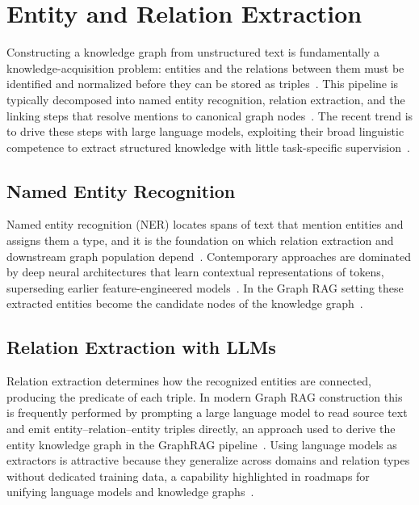 \section{Entity and Relation Extraction}
\label{sec:gr-extraction}

Constructing a knowledge graph from unstructured text is fundamentally a
knowledge-acquisition problem: entities and the relations between them must be
identified and normalized before they can be stored as
triples~\cite{ji2021kgsurvey}. This pipeline is typically decomposed into named
entity recognition, relation extraction, and the linking steps that resolve
mentions to canonical graph nodes~\cite{ji2021kgsurvey}. The recent trend is to
drive these steps with large language models, exploiting their broad linguistic
competence to extract structured knowledge with little task-specific
supervision~\cite{pan2024unifying}.

\subsection{Named Entity Recognition}

Named entity recognition (NER) locates spans of text that mention entities and
assigns them a type, and it is the foundation on which relation extraction and
downstream graph population depend~\cite{li2022ner}. Contemporary approaches are
dominated by deep neural architectures that learn contextual representations of
tokens, superseding earlier feature-engineered models~\cite{li2022ner}. In the
Graph RAG setting these extracted entities become the candidate nodes of the
knowledge graph~\cite{edge2024graphrag}.

\subsection{Relation Extraction with LLMs}

Relation extraction determines how the recognized entities are connected,
producing the predicate of each triple. In modern Graph RAG construction this is
frequently performed by prompting a large language model to read source text and
emit entity--relation--entity triples directly, an approach used to derive the
entity knowledge graph in the GraphRAG pipeline~\cite{edge2024graphrag}. Using
language models as extractors is attractive because they generalize across
domains and relation types without dedicated training data, a capability
highlighted in roadmaps for unifying language models and knowledge
graphs~\cite{pan2024unifying}.

